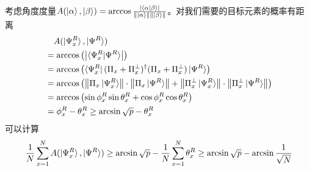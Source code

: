\documentclass{beamer}
\begin{document}
\begin{frame}{}
    考虑角度度量$A(\ket{\alpha},\ket{\beta})=\arccos\frac{\left\lvert \braket{\alpha|\beta}\right\rvert}{\left\|\ket{\alpha}\right\|\left\|\ket{\beta}\right\|}$。对我们需要的目标元素的概率有距离
    \begin{equation*}
        \begin{split}
             & \quad A(\ket{\Psi_{x}^{R}},\ket{\Psi^{R}})                                                                                                                                                                        \\
             & = \arccos\left(\left\lvert \braket{\Psi_{x}^{R}|\Psi^{R}}\right\rvert\right)                                                                                                                                      \\
             & = \arccos\left(\bra{\Psi_{x}^{R}}({\Pi}_{x}+{\Pi}_{x}^{\perp})^{\dagger}({\Pi}_{x}+{\Pi}_{x}^{\perp})\ket{\Psi^{R}}\right)                                                                                        \\
             & = \arccos\left(\left\|{\Pi}_{x}\ket{\Psi_{x}^{R}}\right\|\cdot\left\|{\Pi}_{x}\ket{\Psi^{R}}\right\|+\left\|{\Pi}_{x}^{\perp}\ket{\Psi_{x}^{R}}\right\|\cdot\left\|{\Pi}_{x}^{\perp}\ket{\Psi^{R}}\right\|\right) \\
             & = \arccos\left(\sin\phi_{x}^{R}\sin\theta_{x}^{R}+\cos\phi_{x}^{R}\cos\theta_{x}^{R}\right)                                                                                                                       \\
             & = \phi_{x}^{R}-\theta_{x}^{R} \geq \arcsin\sqrt{p}-\theta_{x}^{R}
        \end{split}
    \end{equation*}
    可以计算
    \begin{equation*}
        \frac{1}{N}\sum_{x=1}^{N}A(\ket{\Psi_{x}^{R}},\ket{\Psi^{R}})
        \geq \arcsin\sqrt{p}-\frac{1}{N}\sum_{x=1}^{N}\theta_{x}^{R}
        \geq \arcsin\sqrt{p}-\arcsin\frac{1}{\sqrt{N}}
    \end{equation*}
\end{frame}
\end{document}
